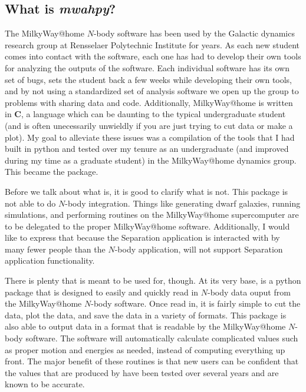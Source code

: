 \documentclass{article}
\begin{document}
\subsection{What is \textit{mwahpy}?}

The MilkyWay@home $N$-body software has been used by the Galactic dynamics research group at Rensselaer Polytechnic Institute for years. As each new student comes into contact with the software, each one has had to develop their own tools for analyzing the outputs of the software. Each individual software has its own set of bugs, sets the student back a few weeks while developing their own tools, and by not using a standardized set of analysis software we open up the group to problems with sharing data and code. Additionally, MilkyWay@home is written in \textbf{C}, a language which can be daunting to the typical undergraduate student (and is often unecessarily unwieldly if you are just trying to cut data or make a plot). My goal to alleviate these issues was a compilation of the tools that I had built in python and tested over my tenure as an undergraduate (and improved during my time as a graduate student) in the MilkyWay@home dynamics group. This became the \mwahpy package. 

Before we talk about what \mwahpy is, it is good to clarify what \mwahpy is not. This package is not able to do $N$-body integration. Things like generating dwarf galaxies, running simulations, and performing routines on the MilkyWay@home supercomputer are to be delegated to the proper MilkyWay@home software. Additionally, I would like to express that because the Separation application is interacted with by many fewer people than the $N$-body application, \mwahpy will not support Separation application functionality. 

There is plenty that \mwahpy is meant to be used for, though. At its very base, \mwahpy is a python package that is designed to easily and quickly read in $N$-body data ouput from the MilkyWay@home $N$-body software. Once read in, it is fairly simple to cut the data, plot the data, and save the data in a variety of formats. This package is also able to output data in a format that is readable by the MilkyWay@home $N$-body software. The software will automatically calculate complicated values such as proper motion and energies as needed, instead of computing everything up front. The major benefit of these routines is that new users can be confident that the values that are produced by \mwahpy have been tested over several years and are known to be accurate. 
\end{document}
